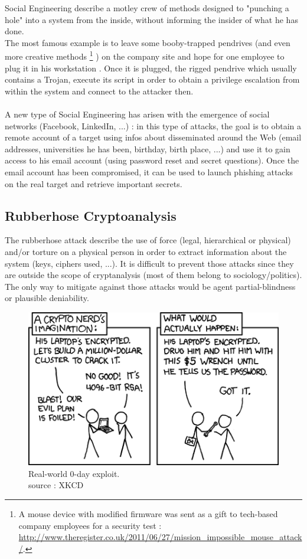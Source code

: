 Social Engineering describe a motley crew of methods designed to "punching a hole" into a system from the inside, without informing the insider of what he has done. \\
The most famous example is to leave some booby-trapped pendrives (and even more creative methods 
\footnote{ A mouse device with modified firmware was sent as a gift to tech-based company employees for a security test : \url{ http://www.theregister.co.uk/2011/06/27/mission_impossible_mouse_attack/}.  }
) on the company site and hope for one employee to plug it in his workstation . Once it is plugged, the rigged pendrive which usually contains a Trojan, execute its script in order to obtain a privilege escalation from within the system and connect to the attacker then.\\\\
A new type of Social Engineering has arisen with the emergence of social networks (Facebook, LinkedIn, ...) : in this type of attacks, the goal is to obtain a remote account of a target using infos about disseminated around the Web (email addresses, universities he has been, birthday, birth place, ...) and use it to gain access to his email account (using password reset and secret questions). Once the email account has been compromised, it can be used to launch phishing attacks on the real target and retrieve important secrets.


\subsection{Rubberhose Cryptoanalysis}

The rubberhose attack describe the use of force (legal, hierarchical or physical) and/or torture on a physical person in order to extract information about the system (keys, ciphers used, ...). It is difficult to prevent those attacks since they are outside the scope of cryptanalysis (most of them belong to sociology/politics). The only way to mitigate against those attacks would be agent partial-blindness or plausible deniability.

\begin{figure}[hb!]
    \centering
       \includegraphics{images/rubberhose.png}
	\caption{Real-world 0-day exploit. \\ source : XKCD}
	\label{fig:RC4}
\end{figure}
